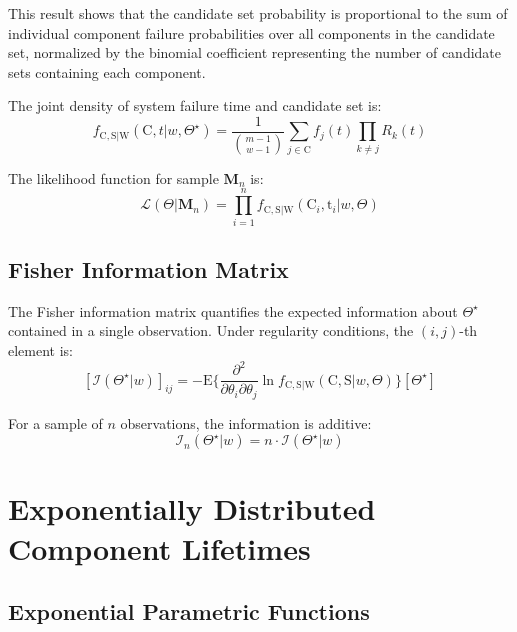 \documentclass[pdflatex,sn-mathphys-num,Numbered]{sn-jnl}
\newcommand{\RV}[1]{\mathrm{#1}}
\newcommand{\Expect}[1]{\mathrm{E}\{#1\}}
\newcommand{\sv}{\RV{S}}           %
\newcommand{\cand}{\RV{C}}         %
\newcommand{\rvcand}{\RV{C}}       %
\newcommand{\ti}{\mathrm{t}}       %
\newcommand{\sysparam}{\Theta}
\newcommand{\tparam}[1]{{#1}^{\star}}  %
\newcommand{\infomatrx}{\mathcal{I}}
\newcommand{\likelihood}{\mathcal{L}}
\newcommand{\mfs}{\mathbf{M}_n}
\newcommand{\pdf}{f}
\newcommand{\srv}{R}
\theoremstyle{thmstyleone}
\theoremstyle{thmstylethree}
\theoremstyle{thmstyletwo}
\begin{document}
This result shows that the candidate set probability is proportional to the sum of individual component failure probabilities over all components in the candidate set, normalized by the binomial coefficient representing the number of candidate sets containing each component.

The joint density of system failure time and candidate set is:
\begin{equation}
\label{eq:joint_density}
\pdf_{\rvcand, \sv | \RV{W}}(\cand, t | w, \tparam{\sysparam}) = \frac{1}{\binom{m-1}{w-1}} \sum_{j \in \cand} \pdf_j(t) \prod_{k \neq j} \srv_k(t)
\end{equation}

The likelihood function for sample $\mfs$ is:
\begin{equation}
\label{eq:likelihood}
\likelihood(\sysparam | \mfs) = \prod_{i=1}^{n} \pdf_{\rvcand, \sv | \RV{W}}(\cand_i, \ti_i | w, \sysparam)
\end{equation}

\subsection{Fisher Information Matrix}

The Fisher information matrix quantifies the expected information about $\tparam{\sysparam}$ contained in a single observation. Under regularity conditions, the $(i,j)$-th element is:
\begin{equation}
\label{eq:fisher_info_element}
[\infomatrx(\tparam{\sysparam} | w)]_{ij} = -\Expect{\frac{\partial^2}{\partial \theta_i \partial \theta_j} \ln \pdf_{\rvcand, \sv | \RV{W}}(\rvcand, \sv | w, \sysparam)}[\tparam{\sysparam}]
\end{equation}

For a sample of $n$ observations, the information is additive:
\begin{equation}
\infomatrx_n(\tparam{\sysparam} | w) = n \cdot \infomatrx(\tparam{\sysparam} | w)
\end{equation}

\section{Exponentially Distributed Component Lifetimes}
\label{sec:exponential}

\subsection{Exponential Parametric Functions}
\end{document}

